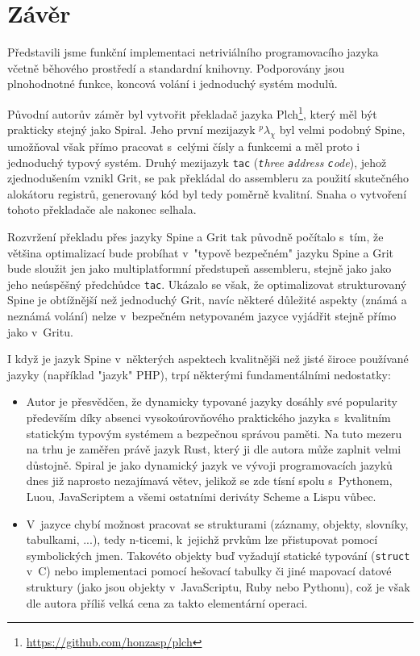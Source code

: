 \chapter{Závěr}

Představili jsme funkční implementaci netriviálního programovacího jazyka včetně
běhového prostředí a standardní knihovny. Podporovány jsou plnohodnotné funkce,
koncová volání i jednoduchý systém modulů.

Původní autorův záměr byl vytvořit překladač jazyka
Plch\footnote{\url{https://github.com/honzasp/plch}}, který měl být prakticky
stejný jako Spiral. Jeho první mezijazyk $^p\lambda_\chi$ byl velmi podobný
Spine, umožňoval však přímo pracovat s~celými čísly a funkcemi a měl proto i
jednoduchý typový systém. Druhý mezijazyk \texttt{tac} (\emph{\texttt{t}hree
\texttt{a}ddress \texttt{c}ode}), jehož zjednodušením vznikl Grit, se pak
překládal do assembleru za použití skutečného alokátoru registrů, generovaný kód
byl tedy poměrně kvalitní. Snaha o vytvoření tohoto překladače ale nakonec
selhala.

Rozvržení překladu přes jazyky Spine a Grit tak původně počítalo s~tím, že
většina optimalizací bude probíhat v~"typově bezpečném" jazyku Spine a Grit
bude sloužit jen jako multiplatformní předstupeň assembleru, stejně jako jako
jeho neúspěšný předchůdce \texttt{tac}. Ukázalo se však, že optimalizovat
strukturovaný Spine je obtížnější než jednoduchý Grit, navíc některé důležité
aspekty (známá a neznámá volání) nelze v~bezpečném netypovaném jazyce vyjádřit
stejně přímo jako v~Gritu.

I když je jazyk Spine v~některých aspektech kvalitnějši než jisté široce
používané jazyky (například "jazyk" PHP), trpí některými fundamentálními
nedostatky:

\begin{itemize}
  \item Autor je přesvědčen, že dynamicky typované jazyky dosáhly své popularity
    především díky absenci vysokoúrovňového praktického jazyka s~kvalitním
    statickým typovým systémem a bezpečnou správou paměti. Na tuto mezeru na
    trhu je zaměřen právě jazyk Rust, který ji dle autora může zaplnit velmi
    důstojně. Spiral je jako dynamický jazyk ve vývoji programovacích jazyků
    dnes již naprosto nezajímavá větev, jelikož se zde tísní spolu s~Pythonem,
    Luou, JavaScriptem a všemi ostatními deriváty Scheme a Lispu vůbec.

  \item V~jazyce chybí možnost pracovat se strukturami (záznamy, objekty,
    slovníky, tabulkami, ...), tedy n-ticemi, k~jejichž prvkům lze přistupovat
    pomocí symbolických jmen. Takovéto objekty buď vyžadují statické typování
    (\texttt{struct} v~C) nebo implementaci pomocí hešovací tabulky či jiné
    mapovací datové struktury (jako jsou objekty v~JavaScriptu, Ruby nebo
    Pythonu), což je však dle autora příliš velká cena za takto elementární
    operaci.
\end{itemize}

